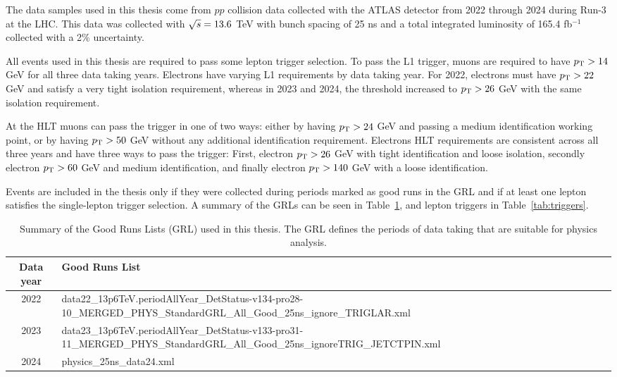 The data samples used in this thesis come from $pp$ collision data collected with the ATLAS detector from 2022 through 2024 during Run-3 at the LHC\@. This data was collected with $\sqrt{s}{} = 13.6$ TeV with bunch spacing of 25 ns and a total integrated luminosity of 165.4 fb$^{-1}$~\cite{atlas_lumi_image} collected with a 2\% uncertainty.

All events used in this thesis are required to pass some lepton trigger selection. To pass the L1 trigger, muons are required to have $p_{\mathrm{T}} > 14$ GeV for all three data taking years. Electrons have varying L1 requirements by data taking year. For 2022, electrons must have $p_{\mathrm{T}} > 22$ GeV and satisfy a very tight isolation requirement, whereas in 2023 and 2024, the threshold increased to $p_{\mathrm{T}} > 26$ GeV with the same isolation requirement.

At the HLT muons can pass the trigger in one of two ways: either by having $p_{\mathrm{T}} > 24$ GeV and passing a medium identification working point, or by having $p_{\mathrm{T}} > 50$ GeV without any additional identification requirement. Electrons HLT requirements are consistent across all three years and have three ways to pass the trigger: First, electron $p_{\mathrm{T}} > 26$ GeV with tight identification and loose isolation, secondly electron $p_{\mathrm{T}} > 60$ GeV and medium identification, and finally electron $p_{\mathrm{T}} > 140$ GeV with a loose identification.

Events are included in the thesis only if they were collected during periods marked as good runs in the GRL and if at least one lepton satisfies the single-lepton trigger selection. A summary of the GRLs can be seen in Table~\ref{tab:grl}, and lepton triggers in Table~\ref{tab:triggers}.

\begin{table}
  \centering
  \begin{tabularx}{1.12\textwidth}{c|>{\centering\arraybackslash}X}
    \hline
    \textbf{Data year} & \textbf{Good Runs List} \\
    \hline
    2022 & data22\_13p6TeV.periodAllYear\_DetStatus-v134-pro28-10\_MERGED\_PHYS\_StandardGRL\_All\_Good\_25ns\_ignore\_TRIGLAR.xml \\ 
    \hline
    2023 & data23\_13p6TeV.periodAllYear\_DetStatus-v133-pro31-11\_MERGED\_PHYS\_StandardGRL\_All\_Good\_25ns\_ignoreTRIG\_JETCTPIN.xml \\
    \hline
    2024 & physics\_25ns\_data24.xml \\
    \hline
  \end{tabularx}
  \caption{Summary of the Good Runs Lists (GRL) used in this thesis. The GRL defines the periods of data taking that are suitable for physics analysis.}\label{tab:grl}
\end{table}

